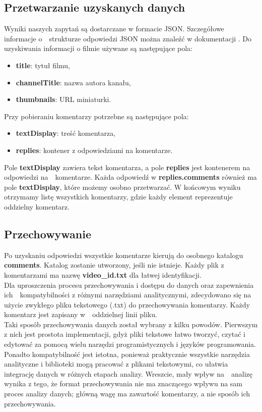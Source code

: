 	\subsection{Przetwarzanie uzyskanych danych}
		Wyniki naszych zapytań są dostarczane w formacie JSON. Szczegółowe informacje o~~strukturze odpowiedzi JSON można znaleźć w dokumentacji \cite{YouTubeAPI}. Do uzyskiwania informacji o filmie używane są następujące pola:
		\begin{itemize}
			\item \textbf{title}: tytuł filmu,
			\item \textbf{channelTitle}: nazwa autora kanału,
			\item \textbf{thumbnails}: URL miniaturki.
		\end{itemize}				
		 Przy pobieraniu komentarzy potrzebne są następujące pola:
		 \begin{itemize}
		 	\item \textbf{textDisplay}: treść komentarza,
		 	\item \textbf{replies}: kontener z odpowiedziami na komentarze.
		 \end{itemize}
 		 Pole \textbf{textDisplay} zawiera tekst komentarza, a pole \textbf{replies} jest kontenerem na odpowiedzi na~~komentarze. Każda odpowiedź w \textbf{replies.comments} również ma pole \textbf{textDisplay}, które możemy osobno przetwarzać. W końcowym wyniku otrzymamy listę wszystkich komentarzy, gdzie każdy element reprezentuje oddzielny komentarz.
		
	\subsection{Przechowywanie}
		Po uzyskaniu odpowiedzi wszystkie komentarze kierują do osobnego katalogu \textbf{comments}. Katalog zostanie utworzony, jeśli nie istnieje. Każdy plik z komentarzami ma nazwę \textbf{video\_id.txt} dla łatwej identyfikacji.\\
		
		Dla uproszczenia procesu przechowywania i dostępu do danych oraz zapewnienia ich~~kompatybilności z różnymi narzędziami analitycznymi, zdecydowano się na użycie zwykłego pliku tekstowego (.txt) do przechowywania komentarzy. Każdy komentarz jest zapisany w~~oddzielnej linii pliku.\\
		
		Taki sposób przechowywania danych został wybrany z kilku powodów. Pierwszym z nich jest prostota implementacji, gdyż pliki tekstowe łatwo tworzyć, czytać i edytować za pomocą wielu narzędzi programistycznych i języków programowania. Ponadto kompatybilność jest istotna, ponieważ praktycznie wszystkie narzędzia analityczne i biblioteki mogą pracować z plikami tekstowymi, co ułatwia integrację danych w różnych etapach analizy. Wreszcie, mały wpływ na~~analizę wynika z tego, że format przechowywania nie ma znaczącego wpływu na sam proces analizy danych; główną wagę ma zawartość komentarzy, a nie sposób ich przechowywania.

